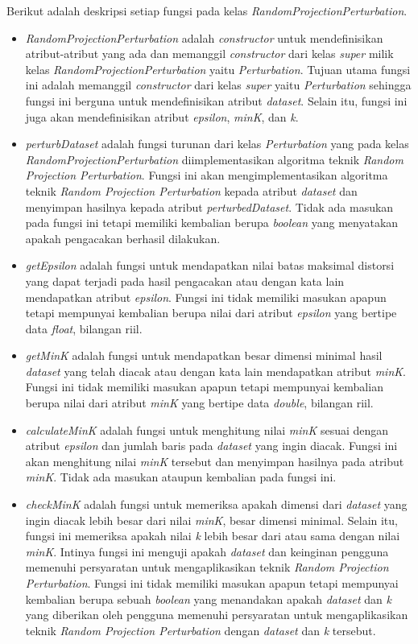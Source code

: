 Berikut adalah deskripsi setiap fungsi pada kelas \textit{RandomProjectionPerturbation}.
\begin{itemize}
	\item \textit{RandomProjectionPerturbation} adalah \textit{constructor} untuk mendefinisikan atribut-atribut yang ada dan memanggil \textit{constructor} dari kelas \textit{super} milik kelas \textit{RandomProjectionPerturbation} yaitu \textit{Perturbation}. Tujuan utama fungsi ini adalah memanggil \textit{constructor} dari kelas \textit{super} yaitu \textit{Perturbation} sehingga fungsi ini berguna untuk mendefinisikan atribut \textit{\textit{dataset}}. Selain itu, fungsi ini juga akan mendefinisikan atribut \textit{epsilon}, \textit{minK}, dan \textit{k}.
	\item \textit{perturbDataset} adalah fungsi turunan dari kelas \textit{Perturbation} yang pada kelas \textit{RandomProjectionPerturbation} diimplementasikan algoritma teknik \textit{Random Projection Perturbation}. Fungsi ini akan mengimplementasikan algoritma teknik \textit{Random Projection Perturbation} kepada atribut \textit{\textit{dataset}} dan menyimpan hasilnya kepada atribut \textit{perturbedDataset}. Tidak ada masukan pada fungsi ini tetapi memiliki kembalian berupa \textit{boolean} yang menyatakan apakah pengacakan berhasil dilakukan.
	\item \textit{getEpsilon} adalah fungsi untuk mendapatkan nilai batas maksimal distorsi yang dapat terjadi pada hasil pengacakan atau dengan kata lain mendapatkan atribut \textit{epsilon}. Fungsi ini tidak memiliki masukan apapun tetapi mempunyai kembalian berupa nilai dari atribut \textit{epsilon} yang bertipe data \textit{float}, bilangan riil.
	\item \textit{getMinK} adalah fungsi untuk mendapatkan besar dimensi minimal hasil \textit{dataset} yang telah diacak atau dengan kata lain mendapatkan atribut \textit{minK}. Fungsi ini tidak memiliki masukan apapun tetapi mempunyai kembalian berupa nilai dari atribut \textit{minK} yang bertipe data \textit{double}, bilangan riil.
	\item \textit{calculateMinK} adalah fungsi untuk menghitung nilai \textit{minK} sesuai dengan atribut \textit{epsilon} dan jumlah baris pada \textit{dataset} yang ingin diacak. Fungsi ini akan menghitung nilai \textit{minK} tersebut dan menyimpan hasilnya pada atribut \textit{minK}. Tidak ada masukan ataupun kembalian pada fungsi ini.
	\item \textit{checkMinK} adalah fungsi untuk memeriksa apakah dimensi dari \textit{\textit{dataset}} yang ingin diacak lebih besar dari nilai \textit{minK}, besar dimensi minimal. Selain itu, fungsi ini memeriksa apakah nilai \textit{k} lebih besar dari atau sama dengan nilai \textit{minK}. Intinya fungsi ini menguji apakah \textit{dataset} dan keinginan pengguna memenuhi persyaratan untuk mengaplikasikan teknik \textit{Random Projection Perturbation}. Fungsi ini tidak memiliki masukan apapun tetapi mempunyai kembalian berupa sebuah \textit{boolean} yang menandakan apakah \textit{\textit{dataset}} dan \textit{k} yang diberikan oleh pengguna memenuhi persyaratan untuk mengaplikasikan teknik \textit{Random Projection Perturbation} dengan \textit{\textit{dataset}} dan \textit{k} tersebut.

\end{itemize}

